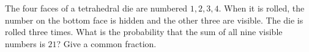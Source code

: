 The four faces of a tetrahedral die are numbered $1,2,3,4$. When it is rolled, the number on the bottom face is hidden and the other three are visible. The die is rolled three times. What is the probability that the sum of all nine visible numbers is $21$? Give a common fraction.
